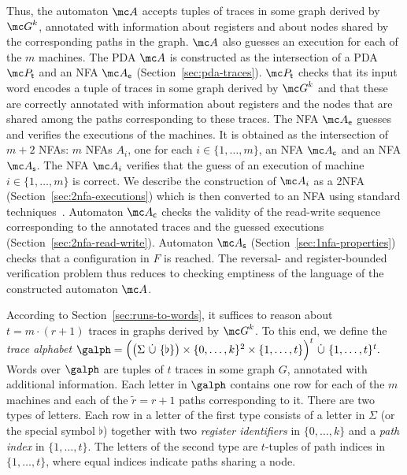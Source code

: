 Thus, the automaton $\mc A$ accepts tuples of traces in some graph derived by ${\mc G}^k$, annotated with information about registers and about nodes shared by the corresponding paths in the graph. 
$\mc A$ also guesses an execution for each of the $m$ machines. 
The PDA $\mc A$ is constructed as the intersection of a PDA $\mc P_{\mathsf t}$ and an NFA $\mc A_{\mathsf e}$ (Section~\ref{sec:pda-traces}). 
$\mc P_{\mathsf t}$ checks that its input word encodes a tuple of traces in some graph derived by ${\mc G}^k$ and that these are correctly annotated with information about registers and the nodes that are shared among the paths corresponding to these traces. 
The NFA $\mc A_{\mathsf{e}}$ guesses and verifies the executions of the machines. It is obtained as the intersection of $m+2$ NFAs:
$m$ NFAs $A_i$, one for each $i \in \{1,\ldots,m\}$, an NFA $\mc A_{\mathsf c}$ and an NFA $\mc A_{\mathsf s}$.
The NFA $\mc A_i$ verifies that the guess of an execution of machine $i \in \{1,\ldots,m\}$ is correct.
We describe the construction of $\mc A_i$ as a 2NFA (Section~\ref{sec:2nfa-executions}) which is then converted to an NFA using standard techniques~\cite{HopcroftUllman}.
Automaton $\mc A_{\mathsf c}$ checks the validity of the read-write sequence corresponding to the annotated traces and the guessed executions  (Section~\ref{sec:2nfa-read-write}). 
Automaton $\mc A_{\mathsf s}$ (Section~\ref{sec:1nfa-properties}) checks that a configuration in $F$ is reached.
The reversal- and register-bounded verification problem thus reduces to checking emptiness of the language of the constructed automaton $\mc A$.

According to Section~\ref{sec:runs-to-words}, it suffices to reason about $t = m \cdot (r+1)$ traces in graphs derived by ${\mc G}^k$.  To this end, we define the \emph{trace alphabet}
$\galph = 
\Big(\big(\Sigma\ \dot{\cup}\ \{\flat\}\big) \times \{0,\ldots,k\}^2 \times
\{1,\ldots,t\} \Big)^t\ \dot{\cup} \ \{1,\ldots,t\}^t.$
Words over $\galph$ are tuples of $t$ traces in some graph $G$, annotated with additional information. Each letter in $\galph$ contains one row for each of the $m$ machines and each of the $\widetilde r = r+1$ paths corresponding to it. There are two types of letters. Each row in a letter of the first type consists of a letter in $\Sigma$ (or the special symbol $\flat$) together with two \emph{register identifiers} in  $\{0,\ldots,k\}$ and a \emph{path index} in $\{1,\ldots,t\}$. The letters of the second type are $t$-tuples of path indices in $\{1,\ldots,t\}$, where equal indices indicate paths sharing a node. 

